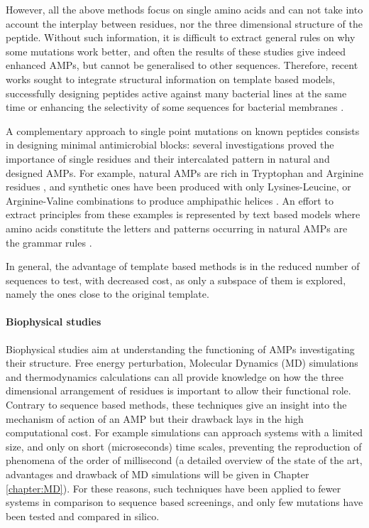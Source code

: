 However, all the above methods focus on single amino acids and can not take into account the interplay between residues, nor the three dimensional structure of the peptide. Without such information, it is difficult to extract general rules on why some mutations work better, and often the results of these studies give indeed enhanced AMPs, but cannot be generalised to other sequences.
%
Therefore, recent works sought to integrate structural information on template based models, successfully designing peptides active against many bacterial lines at the same time \cite{Liu2018} or enhancing the selectivity of some sequences for bacterial membranes \cite{Jiang2011}.

A complementary approach to single point mutations on known peptides consists in designing minimal antimicrobial blocks: several investigations proved the importance of single residues and their intercalated pattern in natural and designed AMPs. For example, natural AMPs are rich in Tryptophan and Arginine residues \cite{Chan2006}, and synthetic ones have been produced with only Lysines-Leucine, or Arginine-Valine combinations to produce amphi­pathic helices \cite{Deslouches2005}.
%
An effort to extract principles from these examples is represented by text based models where amino acids constitute the letters and patterns occurring in natural AMPs are the grammar rules \cite{Loose2006}.

In general, the advantage of template based methods is in the reduced number of sequences to test, with decreased cost, as only a subspace of them is explored, namely the ones close to the original template.


\paragraph{Biophysical studies}
Biophysical studies aim at understanding the functioning of AMPs investigating their structure. Free energy perturbation, Molecular Dynamics (MD) simulations and thermodynamics calculations can all provide knowledge on how the three dimensional arrangement of residues is important to allow their functional role.
%
Contrary to sequence based methods, these techniques give an insight into the mechanism of action of an AMP but their drawback lays in the high computational cost. For example simulations can approach systems with a limited size, and only on short (microseconds) time scales, preventing the reproduction of phenomena of the order of millisecond (a detailed overview of the state of the art, advantages and drawback of MD simulations will be given in Chapter \ref{chapter:MD}).
%
For these reasons, such techniques have been applied to fewer systems in comparison to sequence based screenings, and only few mutations have been tested and compared in silico.

